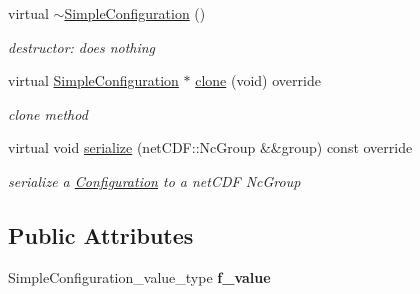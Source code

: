 \begin{DoxyCompactItemize}
\mbox{\label{class_s_m_spp__di__unipi__it_1_1_simple_configuration_aa809c95939f530c7d2feb257569e35fb}} 
virtual \mbox{\hyperlink{class_s_m_spp__di__unipi__it_1_1_simple_configuration_aa809c95939f530c7d2feb257569e35fb}{$\sim$\+Simple\+Configuration}} ()
\begin{DoxyCompactList}\small\item\em destructor\+: does nothing \end{DoxyCompactList}\item 
\mbox{\label{class_s_m_spp__di__unipi__it_1_1_simple_configuration_a1ea836100a12633cd85e9b8dacd7e01c}} 
virtual \mbox{\hyperlink{class_s_m_spp__di__unipi__it_1_1_simple_configuration}{Simple\+Configuration}} $\ast$ \mbox{\hyperlink{class_s_m_spp__di__unipi__it_1_1_simple_configuration_a1ea836100a12633cd85e9b8dacd7e01c}{clone}} (void) override
\begin{DoxyCompactList}\small\item\em clone method \end{DoxyCompactList}\item 
virtual void \mbox{\hyperlink{class_s_m_spp__di__unipi__it_1_1_simple_configuration_a8a626d908100f4419905d89f771150aa}{serialize}} (net\+C\+D\+F\+::\+Nc\+Group \&\&group) const override
\begin{DoxyCompactList}\small\item\em serialize a \mbox{\hyperlink{class_s_m_spp__di__unipi__it_1_1_configuration}{Configuration}} to a net\+C\+DF Nc\+Group \end{DoxyCompactList}\end{DoxyCompactItemize}
\subsection*{Public Attributes}
\begin{DoxyCompactItemize}
\item 
\mbox{\label{class_s_m_spp__di__unipi__it_1_1_simple_configuration_aa483b67f94bffd8e1b4c1147137d9981}} 
Simple\+Configuration\+\_\+value\+\_\+type {\bfseries f\+\_\+value}
\end{DoxyCompactItemize}
